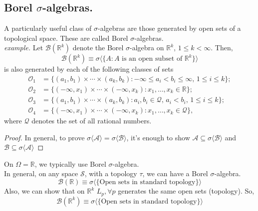 \documentclass[11pt]{article}
\theoremstyle{definition}
\begin{document}
\subsection{Borel $\sigma$-algebras.}
\label{subsec:measures:borel-sigma-algebras} A particularly useful class of $\sigma$-algebras are those generated by open sets of a topological space. These are called Borel $\sigma$-algebras.
\\
\emph{example.}
Let $\mathcal{B}(\mathbb{R}^k)$ denote the Borel $\sigma$-algebra on $\mathbb{R}^k$, $1 \leq k < \infty$.  
Then,
\[
\mathcal{B}(\mathbb{R}^k) \equiv \sigma\langle \{ A : A \text{ is an open subset of } \mathbb{R}^k \} \rangle
\]
is also generated by each of the following classes of sets
\[
\begin{aligned}
\mathcal{O}_1 &= \{(a_1,b_1)\times \cdots \times (a_k,b_k) : -\infty \leq a_i < b_i \leq \infty, \, 1 \leq i \leq k \}; \\
\mathcal{O}_2 &= \{(-\infty, x_1)\times \cdots \times (-\infty, x_k) : x_1, \ldots, x_k \in \mathbb{R}\}; \\
\mathcal{O}_3 &= \{(a_1,b_1)\times \cdots \times (a_k,b_k) : a_i, b_i \in \mathcal{Q}, \, a_i < b_i, \, 1 \leq i \leq k \}; \\
\mathcal{O}_4 &= \{(-\infty, x_1)\times \cdots \times (-\infty, x_k) : x_1, \ldots, x_k \in \mathcal{Q}\},
\end{aligned}
\]
where $\mathcal{Q}$ denotes the set of all rational numbers.
\begin{proof}
    In general, to prove  $\sigma\langle \mathcal{A}\rangle =  \sigma\langle \mathcal{B}\rangle$, it's enough to show $\mathcal{A} \subseteq  \sigma\langle \mathcal{B}\rangle$ and $ \mathcal{B} \subseteq  \sigma\langle \mathcal{A}\rangle$
\end{proof}
\noindent
On $\Omega = \mathbb{R}$, we typically use Borel $\sigma$-algebra.
\\
In general, on any space $\mathcal{S}$, with a topology $\tau$, we can have a Borel $\sigma$-algebra.
\[
\mathcal{B}(\mathbb{R}) \equiv \sigma\langle \{\text{Open sets in standard topology}\} \rangle
\]
Also, we can show that on $\mathbb{R}^k$ $L_p, \forall p$ generates the same open sets (topology). So,
\[
\mathcal{B}(\mathbb{R}^k) \equiv \sigma\langle \{\text{Open sets in standard topology}\} \rangle
\]
\end{document}
